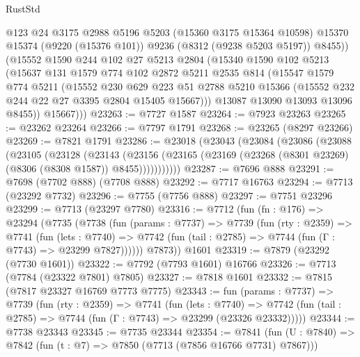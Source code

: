 \begin{lexlean}{RustStd}
\begin{coremodule}
            @123
            @24
            @3175
            @2988
            @5196
            @5203
            (@15360 @3175 @15364 @10598)
            @15370
            @15374
            (@9220 (@15376 @101))
            @9236
            (@8312 (@9238 @5203 @5197))
            @8455))
        (@15552
          @1590
          @244
          @102
          @27
          @5213
          @2804
          (@15340
            @1590
            @102
            @5213
            (@15637
              @131
              @1579
              @774
              @102
              @2872
              @5211
              @2535
              @814
              (@15547
                @1579
                @774
                @5211
                (@15552
                  @230
                  @629
                  @223
                  @51
                  @2788
                  @5210
                  @15366
                  (@15552 @232 @244 @22 @27 @3395 @2804 @15405 @15667)))
              @13087
              @13090
              @13093
              @13096
              @8455))
          @15667)))
@23263 := @7727 @1587
@23264 := @7923 @23263
@23265 := @23262 @23264
@23266 := @7797 @1791
@23268 := @23265 (@8297 @23266)
@23269 := @7821 @1791
@23286 := @23018
    (@23043
      (@23084
        (@23086
          (@23088
            (@23105
              (@23128
                (@23143
                  (@23156
                    (@23165 (@23169 (@23268 (@8301 @23269) (@8306 (@8308 @1587)) @8455)))))))))))
@23287 := @7696 @888
@23291 := @7698 (@7702 @888) (@7708 @888)
@23292 := @7717 @16763
@23294 := @7713 (@23292 @7732)
@23296 := @7755 (@7756 @888)
@23297 := @7751 @23296
@23299 := @7713 (@23297 @7780)
@23316 := @7712
    (fun (fn : @176) =>
    @23294
      (@7735
        (@7738
          (fun (params : @7737) =>
          @7739
            (fun (rty : @2359) =>
            @7741
              (fun (lets : @7740) =>
              @7742 (fun (tail : @2785) => @7744 (fun (Γ : @7743) => @23299 @7827))))))
        @7873))
    @1601
@23319 := @7879 (@23292 (@7730 @1601))
@23322 := @7792 (@7793 @1601) @16766
@23326 := @7713 (@7784 (@23322 @7801) @7805)
@23327 := @7818 @1601
@23332 := @7815 (@7817 @23327 @16769 @7773 @7775)
@23343 := fun (params : @7737) =>
  @7739
    (fun (rty : @2359) =>
    @7741
      (fun (lets : @7740) =>
      @7742 (fun (tail : @2785) => @7744 (fun (Γ : @7743) => @23299 (@23326 @23332)))))
@23344 := @7738 @23343
@23345 := @7735 @23344
@23354 := @7841
    (fun (U : @7840) => @7842 (fun (t : @7) => @7850 (@7713 (@7856 @16766 @7731) @7867)))

\end{coremodule}
\end{lexlean}
